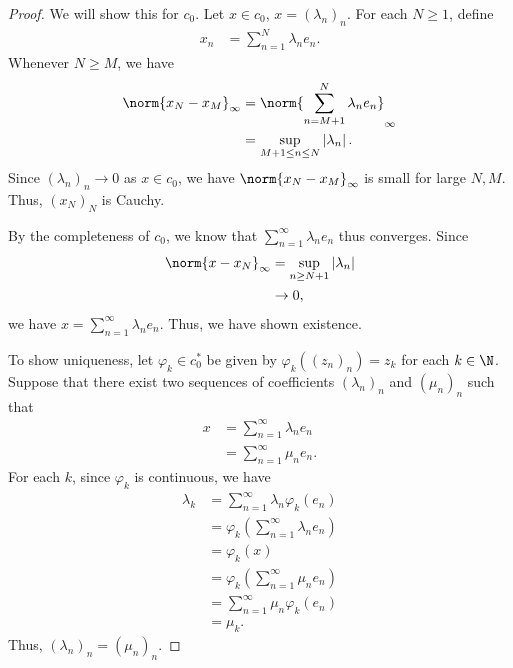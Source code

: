 \documentclass[10pt]{mypackage}
\begin{document}
\begin{proof}
  We will show this for $c_0$. Let $x\in c_0$, $x = \left(\lambda_n\right)_n$. For each $N\geq 1$, define
  \begin{align*}
    x_n &= \sum_{n=1}^{N}\lambda_ne_n.
  \end{align*}
  Whenever $N\geq M$, we have
  \begin{align*}
    \norm{x_N - x_M}_{\infty} &= \norm{\sum_{n=M+1}^{N}\lambda_ne_n}_{\infty}\\
                     &=\sup_{M+1 \leq n \leq N}\left\vert \lambda_n \right\vert.
  \end{align*}
  Since $\left(\lambda_n\right)_n\rightarrow 0$ as $x\in c_0$, we have $\norm{x_N - x_M}_{\infty}$ is small for large $N,M$. Thus, $\left(x_N\right)_N$ is Cauchy.\newline

  By the completeness of $c_0$, we know that $\sum_{n=1}^{\infty}\lambda_ne_n$ thus converges. Since
  \begin{align*}
    \norm{x-x_N}_{\infty} &= \sup_{n\geq N+1} \left\vert \lambda_n \right\vert\\
                          &\rightarrow 0,
  \end{align*}
  we have $x = \sum_{n=1}^{\infty}\lambda_ne_n$. Thus, we have shown existence.\newline

  To show uniqueness, let $\varphi_k\in c_0^{\ast}$ be given by $\varphi_k\left(\left(z_n\right)_n\right) = z_k$ for each $k\in \N$. Suppose that there exist two sequences of coefficients $\left(\lambda_n\right)_n$ and $\left(\mu_n\right)_n$ such that
  \begin{align*}
    x &= \sum_{n=1}^{\infty}\lambda_ne_n\\
      &= \sum_{n=1}^{\infty}\mu_ne_n.
  \end{align*}
  For each $k$, since $\varphi_k$ is continuous, we have
  \begin{align*}
  \lambda_k &= \sum_{n=1}^{\infty}\lambda_n\varphi_k\left(e_n\right)\\
            &= \varphi_k\left(\sum_{n=1}^{\infty}\lambda_n e_n\right)\\
            &= \varphi_k\left(x\right)\\
            &= \varphi_k\left(\sum_{n=1}^{\infty}\mu_ne_n\right)\\
            &= \sum_{n=1}^{\infty}\mu_n\varphi_k\left(e_n\right)\\
            &= \mu_k.
  \end{align*}
  Thus, $\left(\lambda_n\right)_n = \left(\mu_n\right)_n$.
\end{proof}
\end{document}

